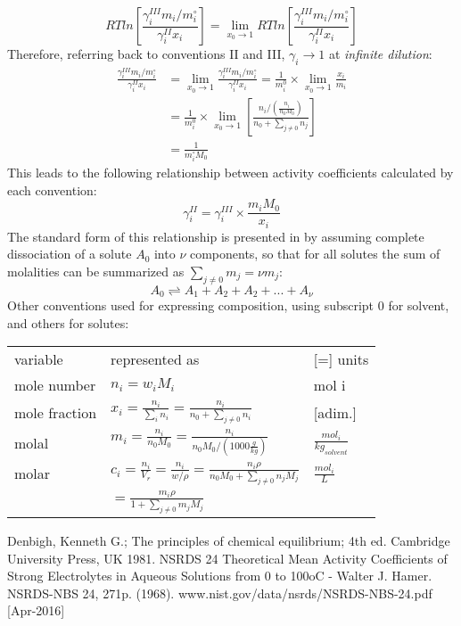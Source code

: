 \documentclass[twocolumn]{article}
\begin{document}
\[
RTln\left[ \frac{\gamma_i^{III} m_i/m_i^{\circ}}{\gamma_i^{II} x_i}\right] = \lim_{x_0 \to 1} RTln\left[ \frac{\gamma_i^{III} m_i/m_i^{\circ}}{\gamma_i^{II} x_i}\right] 
\]
Therefore, referring back to conventions II and III, $\gamma_i \rightarrow 1$ at \textit{infinite dilution}:
\[
\begin{aligned}
\frac{\gamma_i^{III} m_i/m_i^{\circ}}{\gamma_i^{II} x_i} & = \lim_{x_0 \to 1} \frac{\gamma_i^{III} m_i/m_i^{\circ}}{\gamma_i^{II} x_i} = \frac{1}{m_i^0} \times \lim_{x_0 \to 1} \frac{x_i}{m_i} \\
& = \frac{1}{m_i^0} \times \lim_{x_0 \to 1} \left[ \frac{n_i/ \left(\frac{n_i}{n_0 M_0}\right)}{n_0+\sum_{j \neq 0}n_j} \right] \\
& = \frac{1}{m_i^\circ M_0}
\end{aligned}
\]
This leads to the following relationship between activity coefficients calculated by each convention:
\[
\gamma_i^{II} = \gamma_i^{III} \times \frac{m_i M_0}{x_i}
\]
The standard form of this relationship is presented in \cite{Hamer1968} by assuming complete dissociation of a solute $A_0$ into $\nu$ components, so that for all solutes the sum of molalities can be summarized as $\sum_{j \neq 0}m_j = \nu m_j $:
\[
A_0 \rightleftharpoons A_1 + A_2 + A_2 + ... + A_{\nu}
\]
Other conventions used for expressing composition, using subscript 0 for solvent, and others for solutes:
\begin{tabular}{|lll|}
\hline
variable      & represented as                                                                                    & [=] units                     \\
mole number   & $n_i = w_i M_i$                                                                                   & mol i                         \\
mole fraction & $x_i = \frac{n_i}{\sum_i{n_i}} =  \frac{n_i}{n_0 + \sum_{j \neq 0}{n_i}}$                         & [adim.]                       \\
molal         & $m_i = \frac{n_i}{n_0 M_0} = \frac{n_i}{n_0 M_0 / \left(1000 \frac{g}{kg} \right)}$               & $\frac{mol_i} {kg_{solvent}}$ \\
molar         & $c_i = \frac{n_i}{V_r} = \frac{n_i}{w/\rho} = \frac{n_i \rho}{n_0 M_0 + \sum_{j\neq 0}{n_j M_j}}$ & $\frac{mol_i}{L}$\\ 
              & $= \frac{m_i \rho}{1 + \sum_{j\neq 0}{m_j M_j}}$     &       \\
\hline
\end{tabular}
 \begin{thebibliography}{9}
  Denbigh, Kenneth G.; The principles of chemical equilibrium; 4th ed. Cambridge University Press, UK 1981.
  NSRDS 24 Theoretical Mean Activity Coefficients of Strong Electrolytes in Aqueous Solutions from 0 to 100oC - Walter J. Hamer. NSRDS-NBS 24, 271p. (1968). www.nist.gov/data/nsrds/NSRDS-NBS-24.pdf [Apr-2016]
 \end{thebibliography}
\end{document}
